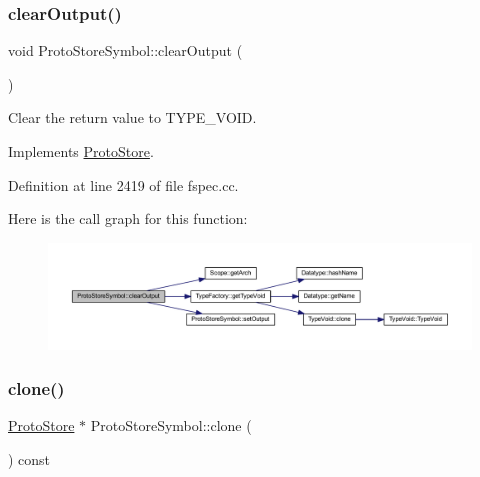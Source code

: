 \subsubsection{\texorpdfstring{clearOutput()}{clearOutput()}}
{\footnotesize\ttfamily void Proto\+Store\+Symbol\+::clear\+Output (\begin{DoxyParamCaption}\item[{void}]{ }\end{DoxyParamCaption})\hspace{0.3cm}{\ttfamily [virtual]}}



Clear the return value to T\+Y\+P\+E\+\_\+\+V\+O\+ID. 



Implements \mbox{\hyperlink{class_proto_store_a02928f3bab6c98f728a1759e3127e5c4}{Proto\+Store}}.



Definition at line 2419 of file fspec.\+cc.

Here is the call graph for this function\+:
\nopagebreak
\begin{figure}[H]
\begin{center}
\leavevmode
\includegraphics[width=350pt]{class_proto_store_symbol_aadbd3a9fba172e28405eeb0001292bff_cgraph}
\end{center}
\end{figure}
\mbox{\label{class_proto_store_symbol_aa6631290325889edb7ef7699fdd8a90f}} 
\subsubsection{\texorpdfstring{clone()}{clone()}}
{\footnotesize\ttfamily \mbox{\hyperlink{class_proto_store}{Proto\+Store}} $\ast$ Proto\+Store\+Symbol\+::clone (\begin{DoxyParamCaption}\item[{void}]{ }\end{DoxyParamCaption}) const\hspace{0.3cm}{\ttfamily [virtual]}}



